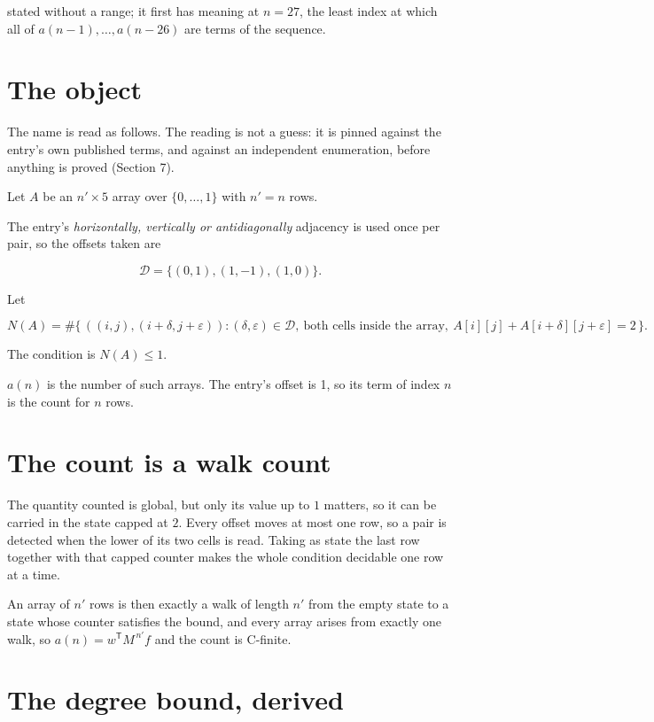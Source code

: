 \documentclass[11pt]{article}
\theoremstyle{definition}
\begin{document}
stated without a range; it first has meaning at $n = 27$, the least index at which all of $a(n-1),\dots,a(n-26)$ are terms of the sequence.

\section{The object}

The name is read as follows. The reading is not a guess: it is pinned against the entry's own published terms, and against an independent enumeration, before anything is proved (Section 7).

Let $A$ be an $n' \times 5$ array over $\{0,\dots,1\}$ with $n' = n$ rows.

The entry's {\itshape horizontally, vertically or antidiagonally} adjacency is used once per pair, so the offsets taken are

\[\mathcal{D} = \{(0,1), (1,-1), (1,0)\}.\]

Let

\[N(A) = \#\bigl\{\,((i,j),(i{+}\delta,j{+}\varepsilon)) : (\delta,\varepsilon) \in \mathcal{D},\ \text{both cells inside the array},\ A[i][j] + A[i{+}\delta][j{+}\varepsilon] = 2\,\bigr\}.\]

The condition is $N(A) \le 1$.

$a(n)$ is the number of such arrays. The entry's offset is 1, so its term of index $n$ is the count for $n$ rows.

\section{The count is a walk count}

The quantity counted is global, but only its value up to $1$ matters, so it can be carried in the state capped at $2$. Every offset moves at most one row, so a pair is detected when the lower of its two cells is read. Taking as state the last row together with that capped counter makes the whole condition decidable one row at a time.

An array of $n'$ rows is then exactly a walk of length $n'$ from the empty state to a state whose counter satisfies the bound, and every array arises from exactly one walk, so $a(n) = w^{\mathsf T}M^{\,n'}f$ and the count is C-finite.

\section{The degree bound, derived}
\end{document}
